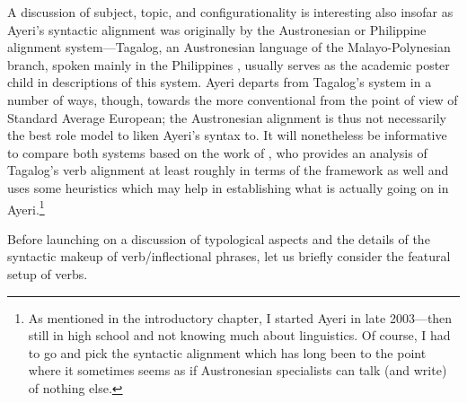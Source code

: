 A discussion of subject, topic, and configurationality is interesting also
insofar as Ayeri's syntactic alignment was originally  by the
Austronesian or Philippine alignment system---Tagalog, an Austronesian language
of the Malayo-Polynesian branch, spoken mainly in the Philippines
\parencites{glottolog:tgl}{schachterotanes1972}, usually serves as the
academic poster child in descriptions of this system. Ayeri departs from
Tagalog's system in a number of ways, though, towards the more conventional
from the point of view of Standard Average European; the Austronesian alignment
is thus not necessarily the best role model to liken Ayeri's syntax to. It will
nonetheless be informative to compare both systems based on the work of
\textcites{kroeger1991}{kroeger1993}, who provides an analysis of Tagalog's
verb alignment at least roughly in terms of the \Lfg{} framework as well and
uses some heuristics which may help in establishing what is actually going on
in Ayeri.\footnote{As mentioned in the introductory chapter, I started Ayeri in
late 2003---then still in high school and not knowing much about linguistics.
Of course, I had to go and pick the syntactic alignment which has long been
 to the point where it  {sometimes
seems as if Austronesian specialists can talk (and write) of nothing else}.}

Before launching on a discussion of typological aspects and the details of the
syntactic makeup of verb/inflectional phrases, let us briefly consider the
featural setup of verbs.

